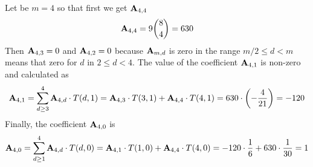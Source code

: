 \begin{example}
    Let be $m=4$ so that first we get ${\mathbf{A}} \sb{4,4}$
    \begin{equation*}
        {\mathbf{A}} \sb{4,4} = 9 \binom{8}{4}= 630
    \end{equation*}
    Then ${\mathbf{A}} \sb{4,3} = 0$ and ${\mathbf{A}} \sb{4,2} = 0$
    because ${\mathbf{A}} \sb{m,d}$ is zero in the range $m/2 \leq d < m$ means that zero for $d$ in $2 \leq d < 4$.
    The value of the coefficient ${\mathbf{A}} \sb{4,1}$ is non-zero and calculated as
    \begin{equation*}
        \begin{split}
            {\mathbf{A}} \sb{4,1}
            = \sum_{d \geq 3}^{4} {\mathbf{A}} \sb{4,d} \cdot T(d,1)
            = {\mathbf{A}} \sb{4,3} \cdot T(3,1) + {\mathbf{A}} \sb{4,4} \cdot T(4,1)
            = 630 \cdot \left( -\frac{4}{21} \right)
            = -120
        \end{split}
    \end{equation*}
    Finally, the coefficient ${\mathbf{A}} \sb{4,0}$ is
    \begin{equation*}
        \begin{split}
            {\mathbf{A}} \sb{4,0}
            = \sum_{d \geq 1}^{4} {\mathbf{A}} \sb{4,d} \cdot T(d, 0)
            = {\mathbf{A}} \sb{4,1} \cdot T(1, 0) + {\mathbf{A}} \sb{4,4} \cdot T(4, 0)
            = -120 \cdot \frac{1}{6} + 630 \cdot \frac{1}{30} = 1
        \end{split}
    \end{equation*}
\end{example}
